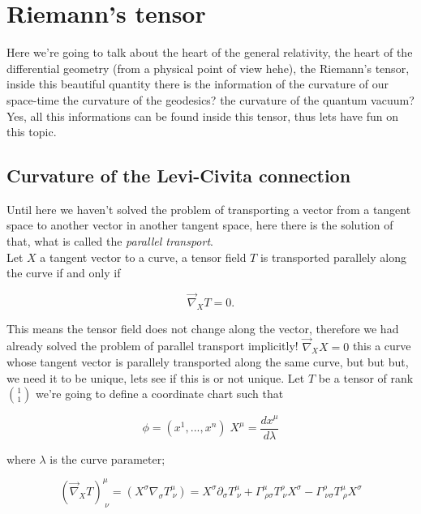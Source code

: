 \section{Riemann's tensor}

        Here we're going to talk about the heart of the general relativity, the heart of the differential geometry (from a physical point of view hehe), the Riemann's tensor, inside this beautiful quantity there is the information of the curvature of our space-time the curvature of the geodesics? the curvature of the quantum vacuum? Yes, all this informations can be found inside this tensor, thus lets have fun on this topic.

    \subsection{Curvature of the Levi-Civita connection}

            Until here we haven't solved the problem of transporting a vector from a tangent space to another vector in another tangent space, here there is the solution of that, what is called the \textit{parallel transport}.\\

            Let $X$ a tangent vector to a curve, a tensor field $T$ is transported parallely along the curve if and only if

            \begin{equation}
                \Vec{\nabla}_XT=0.
            \end{equation}

            This means the tensor field does not change along the vector, therefore we had already solved the problem of parallel transport implicitly! $\Vec{\nabla}_XX=0$ this a curve whose tangent vector is parallely transported along the same curve, but but but, we need it to be unique, lets see if this is or not unique. Let $T$ be a tensor of rank $\binom{1}{1}$ we're going to define a coordinate chart such that

            \begin{equation}
                \phi = (x^1,...,x^n)\;X^{\mu}= \frac{d x^{\mu}}{d\lambda}
            \end{equation}

            where $\lambda$ is the curve parameter;

            \begin{equation}
                \left(\Vec{\nabla}_XT\right)^{\mu}_{\;\nu} = \left(X^{\sigma}\nabla_{\sigma}T^{\mu}_{\;\nu}\right) = X^{\sigma}\partial_{\sigma}T^{\mu}_{\;\nu} + \Gamma^{\mu}_{\;\rho\sigma}T^{\rho}_{\;\nu}X^{\sigma} - \Gamma^{\rho}_{\;\nu\sigma}T^{\mu}_{\;\rho}X^{\sigma}
            \end{equation}

